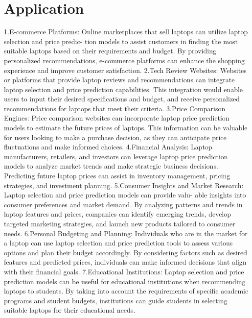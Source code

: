 \section{Application}
1.E-commerce Platforms: Online marketplaces that sell laptops can utilize laptop selection and price predic-
tion models to assist customers in finding the most suitable laptops based on their requirements and budget.
By providing personalized recommendations, e-commerce platforms can enhance the shopping experience and
improve customer satisfaction.
2.Tech Review Websites: Websites or platforms that provide laptop reviews and recommendations can
integrate laptop selection and price prediction capabilities. This integration would enable users to input their
desired specifications and budget, and receive personalized recommendations for laptops that meet their criteria.
3.Price Comparison Engines: Price comparison websites can incorporate laptop price prediction models to
estimate the future prices of laptops. This information can be valuable for users looking to make a purchase
decision, as they can anticipate price fluctuations and make informed choices.
4.Financial Analysis: Laptop manufacturers, retailers, and investors can leverage laptop price prediction
models to analyze market trends and make strategic business decisions. Predicting future laptop prices can
assist in inventory management, pricing strategies, and investment planning.
5.Consumer Insights and Market Research: Laptop selection and price prediction models can provide valu-
able insights into consumer preferences and market demand. By analyzing patterns and trends in laptop
features and prices, companies can identify emerging trends, develop targeted marketing strategies, and launch
new products tailored to consumer needs.
6.Personal Budgeting and Planning: Individuals who are in the market for a laptop can use laptop selection
and price prediction tools to assess various options and plan their budget accordingly. By considering factors
such as desired features and predicted prices, individuals can make informed decisions that align with their
financial goals.
7.Educational Institutions: Laptop selection and price prediction models can be useful for educational
institutions when recommending laptops to students. By taking into account the requirements of specific
academic programs and student budgets, institutions can guide students in selecting suitable laptops for their
educational needs.
